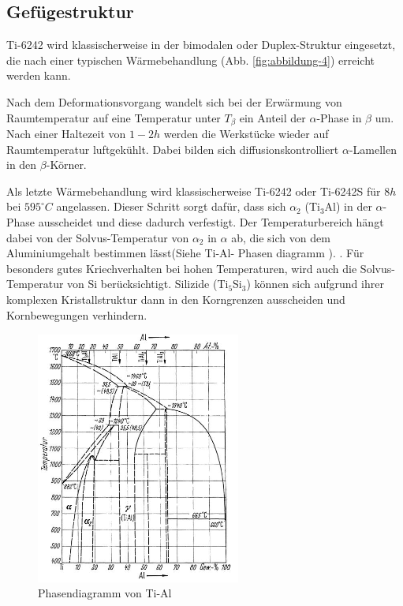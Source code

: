 
\subsection{Gefügestruktur}

Ti-6242 wird klassischerweise in der bimodalen oder Duplex-Struktur eingesetzt, die nach einer typischen Wärmebehandlung (Abb. \ref{fig:abbildung-4}) erreicht werden kann.

Nach dem Deformationsvorgang wandelt sich bei der Erwärmung von Raumtemperatur  auf eine Temperatur unter $T_{\beta}$  ein Anteil der $\alpha$-Phase in $\beta$ um. Nach einer Haltezeit von $1-2h$ werden die Werkstücke wieder auf Raumtemperatur luftgekühlt.
Dabei bilden sich diffusionskontrolliert $\alpha$-Lamellen in den  $\beta$-Körner.


Als letzte Wärmebehandlung wird klassischerweise  Ti-6242 oder Ti-6242S für  $8 h$ bei $595^\circ C$ angelassen. Dieser Schritt sorgt dafür, dass sich $\alpha_2$ (Ti$_3$Al) in der $\alpha$-Phase ausscheidet und diese dadurch verfestigt. Der Temperaturbereich hängt dabei von der Solvus-Temperatur von $\alpha_2$ in $\alpha$ ab, die sich von dem Aluminiumgehalt bestimmen lässt(Siehe Ti-Al- Phasen diagramm ). \cite{Lutjering.2007}.
Für besonders gutes Kriechverhalten bei hohen Temperaturen, wird auch die Solvus-Temperatur von Si berücksichtigt. Silizide (Ti$_5$Si$_3$) können sich aufgrund ihrer komplexen Kristallstruktur dann in den Korngrenzen ausscheiden und Kornbewegungen verhindern.

\begin{figure}
	\centering
	\includegraphics[width=0.6\textwidth]{./Bilder/TiAl.jpg}
	\caption{Phasendiagramm von Ti-Al \cite{Zwicker.2014}}
	\label{fig:PD_tial}
\end{figure}




